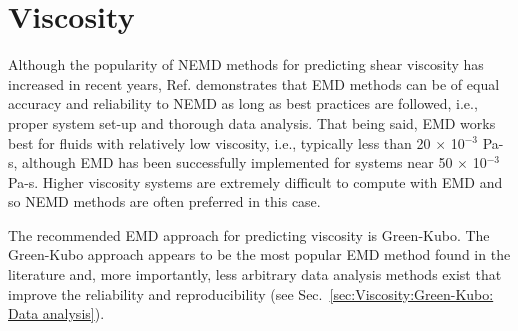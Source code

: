 \documentclass[9pt,bestpractices]{livecoms}
\begin{document}
\section{Viscosity} \label{sec:Viscosity}




Although the popularity of NEMD methods for predicting shear viscosity has increased in recent years, Ref. \cite{Chen2009} demonstrates that EMD methods can be of equal accuracy and reliability to NEMD as long as best practices are followed, i.e., proper system set-up and thorough data analysis. That being said, EMD works best for fluids with relatively low viscosity, i.e., typically less than 20 $\times$ 10$^{-3}$ Pa-s, although EMD has been successfully implemented for systems near 50 $\times$ 10$^{-3}$ Pa-s. Higher viscosity systems are extremely difficult to compute with EMD and so NEMD methods are often preferred in this case.

The recommended EMD approach for predicting viscosity is Green-Kubo. The Green-Kubo approach appears to be the most popular EMD method found in the literature and, more importantly, less arbitrary data analysis methods exist that improve the reliability and reproducibility (see Sec.\ \ref{sec:Viscosity:Green-Kubo: Data analysis}). 
\end{document}
